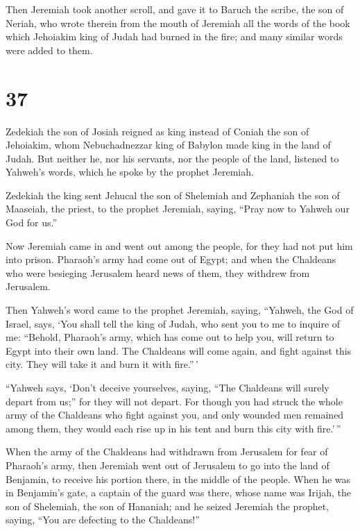  Then Jeremiah took another scroll, and gave it to Baruch
the scribe, the son of Neriah, who wrote therein from the mouth of
Jeremiah all the words of the book which Jehoiakim king of Judah had
burned in the fire; and many similar words were added to them.

\hypertarget{section-36}{%
\section{37}\label{section-36}}

 Zedekiah the son of Josiah reigned as king instead of
Coniah the son of Jehoiakim, whom Nebuchadnezzar king of Babylon made
king in the land of Judah.  But neither he, nor his
servants, nor the people of the land, listened to Yahweh's words, which
he spoke by the prophet Jeremiah.

 Zedekiah the king sent Jehucal the son of Shelemiah and
Zephaniah the son of Maaseiah, the priest, to the prophet Jeremiah,
saying, ``Pray now to Yahweh our God for us.''

 Now Jeremiah came in and went out among the people, for
they had not put him into prison.  Pharaoh's army had come
out of Egypt; and when the Chaldeans who were besieging Jerusalem heard
news of them, they withdrew from Jerusalem.

 Then Yahweh's word came to the prophet Jeremiah, saying,
 ``Yahweh, the God of Israel, says, `You shall tell the king
of Judah, who sent you to me to inquire of me: ``Behold, Pharaoh's army,
which has come out to help you, will return to Egypt into their own
land.  The Chaldeans will come again, and fight against this
city. They will take it and burn it with fire.''\,'

 ``Yahweh says, `Don't deceive yourselves, saying, ``The
Chaldeans will surely depart from us;'' for they will not depart.
 For though you had struck the whole army of the Chaldeans
who fight against you, and only wounded men remained among them, they
would each rise up in his tent and burn this city with fire.'\,''

 When the army of the Chaldeans had withdrawn from
Jerusalem for fear of Pharaoh's army,  then Jeremiah went
out of Jerusalem to go into the land of Benjamin, to receive his portion
there, in the middle of the people.  When he was in
Benjamin's gate, a captain of the guard was there, whose name was
Irijah, the son of Shelemiah, the son of Hananiah; and he seized
Jeremiah the prophet, saying, ``You are defecting to the Chaldeans!''

